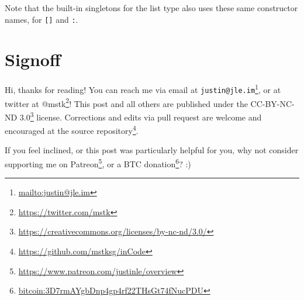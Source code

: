 \documentclass[]{article}
\renewcommand{\href}[2]{#2\footnote{\url{#1}}}
\begin{document}
\begin{enumerate}
  Note that the built-in singletons for the list type also uses these same
  constructor names, for \texttt{{[}{]}} and \texttt{:}.
\end{enumerate}

\hypertarget{signoff}{%
\section{Signoff}\label{signoff}}

Hi, thanks for reading! You can reach me via email at
\href{mailto:justin@jle.im}{\nolinkurl{justin@jle.im}}, or at twitter at
\href{https://twitter.com/mstk}{@mstk}! This post and all others are published
under the \href{https://creativecommons.org/licenses/by-nc-nd/3.0/}{CC-BY-NC-ND
3.0} license. Corrections and edits via pull request are welcome and encouraged
at \href{https://github.com/mstksg/inCode}{the source repository}.

If you feel inclined, or this post was particularly helpful for you, why not
consider \href{https://www.patreon.com/justinle/overview}{supporting me on
Patreon}, or a \href{bitcoin:3D7rmAYgbDnp4gp4rf22THsGt74fNucPDU}{BTC donation}?
:)
\end{document}
